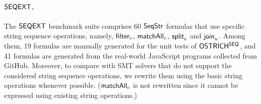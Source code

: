 \paragraph*{${\sf SEQEXT}$.}
The ${\sf SEQEXT}$ benchmark suite comprises 60 ${\sf SeqStr}$ formulas that use specific string sequence operations, namely, ${\sf filter}_e$, $\mathsf{matchAll}_e$, $\mathsf{split}_e$ and $\mathsf{join}_u$. Among them, 19 formulas are manually generated for the unit tests of ${\sf OSTRICH^{SEQ}}$, and 41 formulas are generated from the real-world JavaScript programs collected from GitHub. Moreover, to compare with SMT solvers that do not support the considered string sequence operations, we rewrite them using the basic string operations whenever possible. ($\mathsf{matchAll}_e$ is not rewritten since it cannot be expressed using existing string operations.) 


